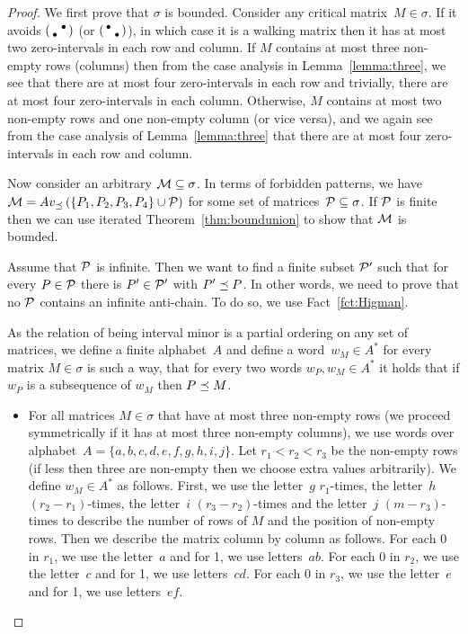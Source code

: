 \begin{proof}
We first prove that $\sigma$ is bounded. Consider any critical matrix~$M\in\sigma$. If it avoids $\left(\begin{smallmatrix} &\bullet\\\bullet& \end{smallmatrix}\right)$ (or $\left(\begin{smallmatrix}\bullet& \\ &\bullet\end{smallmatrix}\right)$), in which case it is a walking matrix then it has at most two zero-intervals in each row and column. If $M$ contains at most three non-empty rows (columns) then from the case analysis in Lemma~\ref{lemma:three}, we see that there are at most four zero-intervals in each row and trivially, there are at most four zero-intervals in each column. Otherwise, $M$ contains at most two non-empty rows and one non-empty column (or vice versa), and we again see from the case analysis of Lemma~\ref{lemma:three} that there are at most four zero-intervals in each row and column.

Now consider an arbitrary $\mathcal{M}\subseteq\sigma$. In terms of forbidden patterns, we have $\mathcal{M}=Av_{\preceq}\left(\{P_1,P_2,P_3,P_4\}\cup\mathcal{P}\right)$ for some set of matrices~$\mathcal{P}\subseteq\sigma$. If $\mathcal{P}$ is finite then we can use iterated Theorem~\ref{thm:boundunion} to show that $\mathcal{M}$ is bounded.

Assume that $\mathcal{P}$ is infinite. Then we want to find a finite subset $\mathcal{P'}$ such that for every $P\in\mathcal{P}$ there is $P'\in\mathcal{P'}$ with $P'\preceq P$. In other words, we need to prove that no $\mathcal{P}$ contains an infinite anti-chain. To do so, we use Fact~\ref{fct:Higman}.

As the relation of being interval minor is a partial ordering on any set of matrices, we define a finite alphabet~$A$ and define a word~$w_M\in A^*$ for every matrix $M\in\sigma$ is such a way, that for every two words $w_P,w_M\in A^*$ it holds that if $w_P$ is a subsequence of $w_M$ then $P\preceq M$.
\begin{itemize}
	\item For all matrices $M\in\sigma$ that have at most three non-empty rows (we proceed symmetrically if it has at most three non-empty columns), we use words over alphabet~$A=\{a,b,c,d,e,f,g,h,i,j\}$. Let $r_1<r_2<r_3$ be the non-empty rows (if less then three are non-empty then we choose extra values arbitrarily). We define $w_M\in A^*$ as follows. First, we use the letter~$g$ $r_1$-times, the letter~$h$ $(r_2-r_1)$-times, the letter~$i$ $(r_3-r_2)$-times and the letter~$j$ $(m-r_3)$-times to describe the number of rows of $M$ and the position of non-empty rows. Then we describe the matrix column by column as follows. For each 0 in $r_1$, we use the letter~$a$ and for 1, we use letters~$ab$. For each 0 in $r_2$, we use the letter~$c$ and for 1, we use letters~$cd$. For each 0 in $r_3$, we use the letter~$e$ and for 1, we use letters~$ef$.
		

\end{itemize}
\end{proof}
